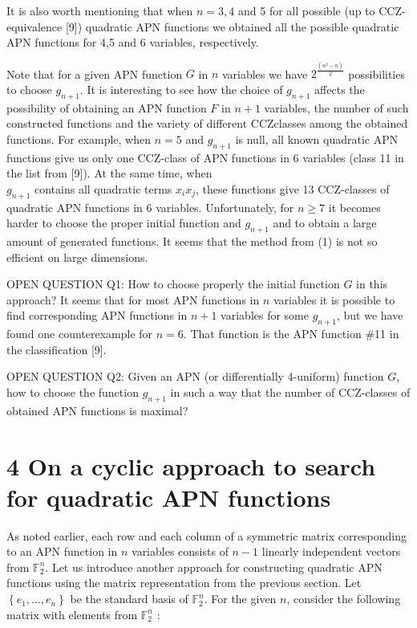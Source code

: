 \documentclass[10pt]{article}
\begin{document}
It is also worth mentioning that when $n=3,4$ and 5 for all possible (up to CCZ-equivalence [9]) quadratic APN functions we obtained all the possible quadratic APN functions for 4,5 and 6 variables, respectively.

Note that for a given APN function $G$ in $n$ variables we have $2^{\frac{\left(n^{2}-n\right)}{2}}$ possibilities to choose $g_{n+1}$. It is interesting to see how the choice of $g_{n+1}$ affects the possibility of obtaining an APN function $F$ in $n+1$ variables, the number of such constructed functions and the variety of different CCZclasses among the obtained functions. For example, when $n=5$ and $g_{n+1}$ is null, all known quadratic APN functions give us only one CCZ-class of APN functions in 6 variables (class 11 in the list from [9]). At the same time, when\\
$g_{n+1}$ contains all quadratic terms $x_{i} x_{j}$, these functions give 13 CCZ-classes of quadratic APN functions in 6 variables. Unfortunately, for $n \geqslant 7$ it becomes harder to choose the proper initial function and $g_{n+1}$ and to obtain a large amount of generated functions. It seems that the method from (1) is not so efficient on large dimensions.

OPEN QUESTION Q1: How to choose properly the initial function $G$ in this approach? It seems that for most APN functions in $n$ variables it is possible to find corresponding APN functions in $n+1$ variables for some $g_{n+1}$, but we have found one counterexample for $n=6$. That function is the APN function \#11 in the classification [9].

OPEN QUESTION Q2: Given an APN (or differentially 4-uniform) function $G$, how to choose the function $g_{n+1}$ in such a way that the number of CCZ-classes of obtained APN functions is maximal?

\section*{4 On a cyclic approach to search for quadratic APN functions}
As noted earlier, each row and each column of a symmetric matrix corresponding to an APN function in $n$ variables consists of $n-1$ linearly independent vectors from $\mathbb{F}_{2}^{n}$. Let us introduce another approach for constructing quadratic APN functions using the matrix representation from the previous section. Let $\left\{e_{1}, \ldots, e_{n}\right\}$ be the standard basis of $\mathbb{F}_{2}^{n}$. For the given $n$, consider the following matrix with elements from $\mathbb{F}_{2}^{n}$ :
\end{document}
